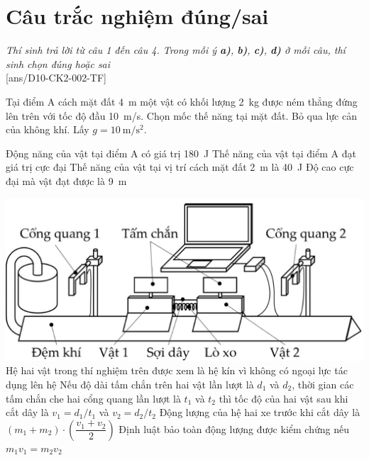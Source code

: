 \section{Câu trắc nghiệm đúng/sai} 
\textit{Thí sinh trả lời từ câu 1 đến câu 4. Trong mỗi ý \textbf{a)}, \textbf{b)}, \textbf{c)}, \textbf{d)} ở mỗi câu, thí sinh chọn đúng hoặc sai}
\setcounter{ex}{0}\\
[ans/D10-CK2-002-TF]
\begin{ex}
	Tại điểm A cách mặt đất \SI{4}{\meter} một vật có khối lượng \SI{2}{\kilogram} được ném thẳng đứng lên trên với tốc độ đầu \SI{10}{\meter/\second}. Chọn mốc thế năng tại mặt đất. Bỏ qua lực cản của không khí. Lấy $g=\SI{10}{\meter/\second^2}$.
	
	\choiceTF
	{Động năng của vật tại điểm A có giá trị \SI{180}{\joule}}
	{Thế năng của vật tại điểm A đạt giá trị cực đại}
	{\True Thế năng của vật tại vị trí cách mặt đất \SI{2}{\meter} là \SI{40}{\joule}}
	{\True Độ cao cực đại mà vật đạt được là \SI{9}{\meter}}
	\loigiai{}
\end{ex}
\begin{ex}
	{\includegraphics[scale=0.3]{../figs/D10-CK2-002-2}}
	\choiceTF
	{Hệ hai vật trong thí nghiệm trên được xem là hệ kín vì không có ngoại lực tác dụng lên hệ}
	{\True Nếu độ dài tấm chắn trên hai vật lần lượt là $d_1$ và $d_2$, thời gian các tấm chắn che hai cổng quang lần lượt là $t_1$ và $t_2$ thì tốc độ của hai vật sau khi cắt dây là $v_1=d_1/t_1$ và $v_2=d_2/t_2$}
	{Động lượng của hệ hai xe trước khi cắt dây là $\left(m_1+m_2\right)\cdot\left(\dfrac{v_1+v_2}{2}\right)$}
	{\True Định luật bảo toàn động lượng được kiểm chứng nếu $m_1v_1=m_2v_2$}
	\loigiai{}
\end{ex}
